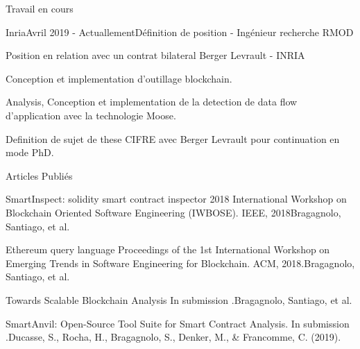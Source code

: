\documentclass{resume} %
\begin{document}
\begin{rSection}{Travail en cours}
		\begin{rSubsection}{Inria}{Avril 2019 - Actuallement}{D\'efinition de position - Ing\'{e}nieur recherche RMOD}
		\item  Position en relation avec un contrat bilateral Berger Levrault - INRIA
		\item  Conception et implementation d'outillage blockchain.  
		\item  Analysis, Conception et implementation de la detection de data flow d'application avec la technologie Moose.
		\item  Definition de sujet de these CIFRE avec Berger Levrault pour continuation en mode PhD.
	\end{rSubsection}
	

	

\end{rSection}
\begin{rSection}{Articles Publi\'{e}s}
\begin{rSubsection}{ SmartInspect: solidity smart contract inspector }{2018 International Workshop on Blockchain Oriented Software Engineering (IWBOSE). IEEE, 2018}{Bragagnolo, Santiago, et al.}
\item
\end{rSubsection}
\begin{rSubsection}{ Ethereum query language }{Proceedings of the 1st International Workshop on Emerging Trends in Software Engineering for Blockchain. ACM, 2018.}{Bragagnolo, Santiago, et al.}
\item
\end{rSubsection}
\begin{rSubsection}{ Towards Scalable Blockchain Analysis }{ In submission .}{Bragagnolo, Santiago, et al.}
\item
\end{rSubsection}
\begin{rSubsection}{ SmartAnvil: Open-Source Tool Suite for Smart Contract Analysis. }{ In submission .}{Ducasse, S., Rocha, H., Bragagnolo, S., Denker, M., \& Francomme, C. (2019).}
\item
\end{rSubsection}
\end{rSection}
\end{document}
